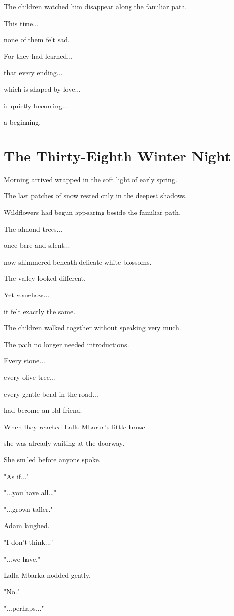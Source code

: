 \documentclass[12pt,openany]{book}
\begin{document}
The children watched him disappear along the familiar path.

This time...

none of them felt sad.

For they had learned...

that every ending...

which is shaped by love...

is quietly becoming...

a beginning.
\chapter{The Thirty-Eighth Winter Night}

Morning arrived wrapped in the soft light of early spring.

The last patches of snow rested only in the deepest shadows.

Wildflowers had begun appearing beside the familiar path.

The almond trees...

once bare and silent...

now shimmered beneath delicate white blossoms.

The valley looked different.

Yet somehow...

it felt exactly the same.

The children walked together without speaking very much.

The path no longer needed introductions.

Every stone...

every olive tree...

every gentle bend in the road...

had become an old friend.

When they reached Lalla Mbarka's little house...

she was already waiting at the doorway.

She smiled before anyone spoke.

"As if..."

"...you have all..."

"...grown taller."

Adam laughed.

"I don't think..."

"...we have."

Lalla Mbarka nodded gently.

"No."

"...perhaps..."
\end{document}
